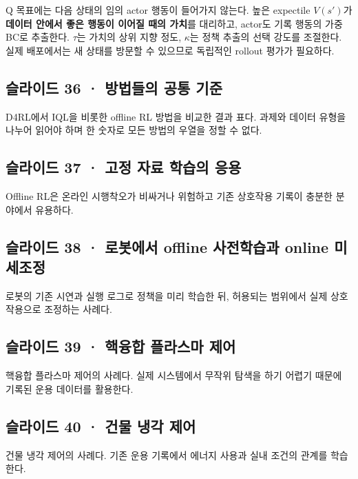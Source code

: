 \documentclass[11pt,a4paper]{article}
\begin{document}
Q 목표에는 다음 상태의 임의 actor 행동이 들어가지 않는다. 높은 expectile $V(s')$가 \textbf{데이터 안에서 좋은 행동이 이어질 때의 가치}를 대리하고, actor도 기록 행동의 가중 BC로 추출한다. $\tau$는 가치의 상위 지향 정도, $\kappa$는 정책 추출의 선택 강도를 조절한다. 실제 배포에서는 새 상태를 방문할 수 있으므로 독립적인 rollout 평가가 필요하다.\par

\subsection{슬라이드 36 · 방법들의 공통 기준}

D4RL에서 IQL을 비롯한 offline RL 방법을 비교한 결과 표다. 과제와 데이터 유형을 나누어 읽어야 하며 한 숫자로 모든 방법의 우열을 정할 수 없다.\par

\subsection{슬라이드 37 · 고정 자료 학습의 응용}

Offline RL은 온라인 시행착오가 비싸거나 위험하고 기존 상호작용 기록이 충분한 분야에서 유용하다.\par

\subsection{슬라이드 38 · 로봇에서 offline 사전학습과 online 미세조정}

로봇의 기존 시연과 실행 로그로 정책을 미리 학습한 뒤, 허용되는 범위에서 실제 상호작용으로 조정하는 사례다.\par

\subsection{슬라이드 39 · 핵융합 플라스마 제어}

핵융합 플라스마 제어의 사례다. 실제 시스템에서 무작위 탐색을 하기 어렵기 때문에 기록된 운용 데이터를 활용한다.\par

\subsection{슬라이드 40 · 건물 냉각 제어}

건물 냉각 제어의 사례다. 기존 운용 기록에서 에너지 사용과 실내 조건의 관계를 학습한다.\par
\end{document}
